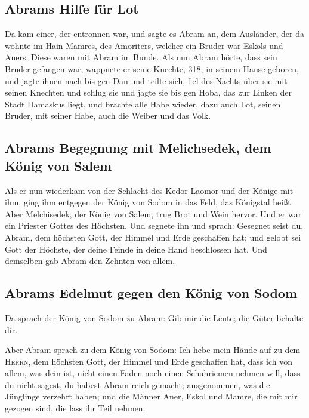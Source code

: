 \hypertarget{abrams-hilfe-fuxfcr-lot}{%
\subsection{Abrams Hilfe für Lot}\label{abrams-hilfe-fuxfcr-lot}}

 Da kam einer, der entronnen war, und sagte es Abram an,
dem Ausländer, der da wohnte im Hain Mamres, des Amoriters, welcher ein
Bruder war Eskols und Aners. Diese waren mit Abram im Bunde.
 Als nun Abram hörte, dass sein Bruder gefangen war,
wappnete er seine Knechte, 318, in seinem Hause geboren, und jagte ihnen
nach bis gen Dan  und teilte sich, fiel des Nachts über
sie mit seinen Knechten und schlug sie und jagte sie bis gen Hoba, das
zur Linken der Stadt Damaskus liegt,  und brachte alle
Habe wieder, dazu auch Lot, seinen Bruder, mit seiner Habe, auch die
Weiber und das Volk.

\hypertarget{abrams-begegnung-mit-melichsedek-dem-kuxf6nig-von-salem}{%
\subsection{Abrams Begegnung mit Melichsedek, dem König von
Salem}\label{abrams-begegnung-mit-melichsedek-dem-kuxf6nig-von-salem}}

 Als er nun wiederkam von der Schlacht des Kedor-Laomor
und der Könige mit ihm, ging ihm entgegen der König von Sodom in das
Feld, das Königstal heißt.  Aber Melchisedek, der König
von Salem, trug Brot und Wein hervor. Und er war ein Priester Gottes des
Höchsten.  Und segnete ihn und sprach: Gesegnet seist du,
Abram, dem höchsten Gott, der Himmel und Erde geschaffen hat;
 und gelobt sei Gott der Höchste, der deine Feinde in
deine Hand beschlossen hat. Und demselben gab Abram den Zehnten von
allem.

\hypertarget{abrams-edelmut-gegen-den-kuxf6nig-von-sodom}{%
\subsection{Abrams Edelmut gegen den König von
Sodom}\label{abrams-edelmut-gegen-den-kuxf6nig-von-sodom}}

 Da sprach der König von Sodom zu Abram: Gib mir die
Leute; die Güter behalte dir.

 Aber Abram sprach zu dem König von Sodom: Ich hebe mein
Hände auf zu dem \textsc{Herrn}, dem höchsten Gott, der Himmel und Erde
geschaffen hat,  dass ich von allem, was dein ist, nicht
einen Faden noch einen Schuhriemen nehmen will, dass du nicht sagest, du
habest Abram reich gemacht;  ausgenommen, was die
Jünglinge verzehrt haben; und die Männer Aner, Eskol und Mamre, die mit
mir gezogen sind, die lass ihr Teil nehmen.

